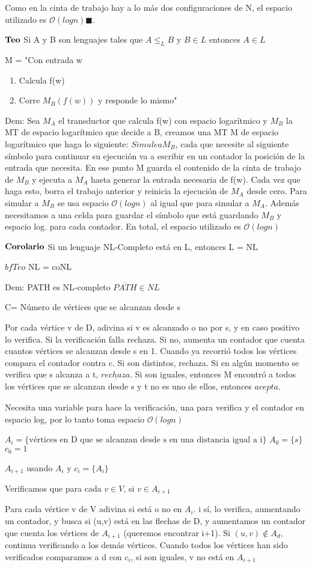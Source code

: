 \documentclass{homework}
\begin{document}
Como en la cinta de trabajo hay a lo más dos configuraciones de N, el espacio utilizado es $\mathcal{O}(logn) \blacksquare$.

$\bf{Teo}$ Si A y B son lenguajes tales que $A \leq_L B$ y $B \in L$ entonces $A \in L$

M = "Con entrada w
\begin{enumerate}
	\item Calcula f(w)
	\item Corre $M_B (f(w))$ y responde lo mismo" 
\end{enumerate}

Dem: Sea $M_A$ el transductor que calcula f(w) con espacio logarítmico y $M_B$ la MT de espacio logarítmico que decide a B, creamos una MT M de espacio logarítmico que haga lo siguiente:
$Simule a M_B$, cada que necesite al siguiente símbolo para continuar su ejecución va a escribir en un contador la posición de la entrada que necesita. En ese punto M guarda el contenido de la cinta de trabajo de $M_B$ y ejecuta a $M_A$ hasta generar la entrada necesaria de f(w). Cada vez que haga esto, borra el trabajo anterior y reinicia la ejecución de $M_A$ desde cero. Para simular a $M_B$ se usa espacio $\mathcal{O}(logn)$ al igual que para simular a $M_A$. Además necesitamos a una celda para guardar el símbolo que está guardando $M_B$ y espacio log. para cada contador. En total, el espacio utilizado es $\mathcal{O}(logn)$

$\bf{Corolario}$ Si un lenguaje NL-Completo está en L, entonces L = NL

$bf{Teo}$ NL = coNL

Dem: PATH es NL-completo $\overline{PATH} \in NL$


C= Número de vértices que se alcanzan desde s

Por cada vértice v de D, adivina si v es alcanzado o no por s, y en caso positivo lo verifica. Si la verificación falla rechaza. Si no, aumenta un contador que cuenta cuantos vértices se alcanzan desde s en 1. Cuando ya recorrió todos los vértices compara el contador contra c. Si son distintos, rechaza. Si en algún momento se verifica que s alcanza a t, $\underline{rechaza}$. Si son iguales, entonces M encontró a todos los vértices que se alcanzan desde s y t no es uno de ellos, entonces $\underline{acepta}$.

Necesita una variable para hace la verificación, una para verifica y el contador en espacio log, por lo tanto toma espacio $\mathcal{O}(logn)$

$A_i = \{\text{vértices en D que se alcanzan desde s en una distancia igual a i}\}$ $A_0 = \{s\}$ $c_0 = 1$ 

$A_{i+1}$ usando $A_i$ y $c_i = \{A_i\}$

Verificamos que para cada $v \in V$, si $v \in A_{i+1}$

Para cada vértice v de V adivina si está o no en $A_i$. i sí, lo verifica, aumentando un contador, y busca si (u,v) está en las flechas de D, y aumentamos un contador que cuenta los vértices de $A_{i+1}$ (queremos encontrar i+1). Si $(u,v) \notin A_d$, continua verificando a los demás vértices. Cuando todos los vértices han sido verificados comparamos a d con $c_i$, si son iguales, v no está en $A_{i+1}$
\end{document}
